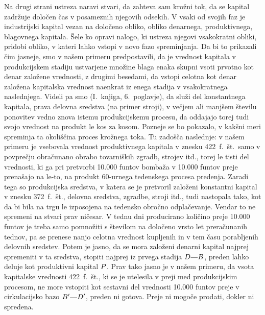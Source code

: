 \documentclass[kapital_02.tex]{subfiles}
\begin{document}
Na drugi strani ustreza naravi stvari, da zahteva sam krožni tok, da se kapital zadržuje določen čas v posameznih njegovih odsekih. V vsaki od svojih faz je industrijski kapital vezan na določeno obliko, obliko denarnega, produktivnega, blagovnega kapitala. Šele ko opravi nalogo, ki ustreza njegovi vsakokratni obliki, pridobi obliko, v kateri lahko vstopi v novo fazo spreminjanja. Da bi to prikazali čim jasneje, smo v našem primeru predpostavili, da je vrednost kapitala v produkcijskem stadiju ustvarjene množine blaga enaka skupni vsoti prvotno kot denar založene vrednosti, z drugimi besedami, da vstopi celotna kot denar založena kapitalska vrednost naenkrat iz enega stadija v vsakokratnega naslednjega. Videli pa smo (I.~knjiga, 6.~poglavje), da služi del konstantnega kapitala, prava delovna sredstva (na primer stroji), v večjem ali manjšem številu ponovitev vedno znova istemu produkcijskemu procesu, da oddajajo torej tudi svojo vrednost na produkt le kos za kosom. Pozneje se bo pokazalo, v kakšni meri spreminja ta okoliščina proces krožnega toka. Tu zadošča naslednje: v našem primeru je vsebovala vrednost produktivnega kapitala v znesku 422~f.~št.\ samo v povprečju obračunano obrabo tovarniških zgradb, strojev itd., torej le tisti del vrednosti, ki ga pri pretvorbi 10.000 funtov bombaža v 10.000 funtov preje prenašajo na le-to, na produkt 60-urnega tedenskega procesa predenja. Zaradi tega so produkcijska sredstva, v katera se je pretvoril založeni konstantni kapital v znesku 372~f.~št., delovna sredstva, zgradbe, stroji itd., tudi nastopala tako, kot da bi bila na trgu le izposojena na tedensko obročno odplačevanje. Vendar to ne spremeni na stvari prav ničesar. V tednu dni producirano količino preje 10.000 funtov je treba samo pomnožiti s številom na določeno vrsto let preračunanih tednov, pa se prenese nanjo celotna vrednost kupljenih in v tem času porabljenih delovnih sredstev. Potem je jasno, da se mora založeni denarni kapital najprej spremeniti v ta sredstva, stopiti najprej iz prvega stadija \(\KPED\KPEcrta\KPEB\), preden lahko deluje kot produktivni kapital \(P\). Prav tako jasno je v našem primeru, da vsota kapitalske vrednosti 422~f.~št., ki se je utelesila v preji med produkcijskim procesom, ne more vstopiti kot sestavni del vrednosti 10.000 funtov preje v cirkulacijsko bazo \(\KPEB'\KPEcrta\KPED'\), preden ni gotova. Preje ni mogoče prodati, dokler ni spredena.
\end{document}
